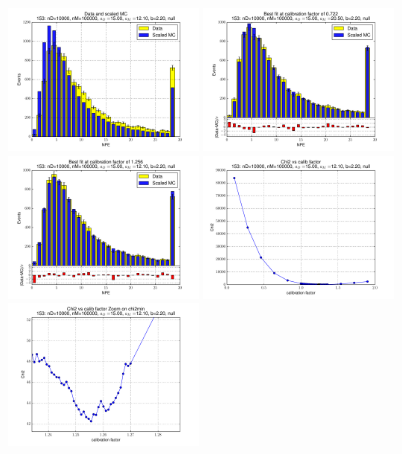 
 \begin{figure}[htbp] \begin{center} 
\includegraphics[width=0.45\textwidth]{../FIGURES/153/FIG_Data_and_scaled_MC.pdf} 
\includegraphics[width=0.45\textwidth]{../FIGURES/153/FIG_Best_fit_at_calibration_factor_of_0_722.pdf} 
\includegraphics[width=0.45\textwidth]{../FIGURES/153/FIG_Best_fit_at_calibration_factor_of_1_256.pdf} 
\includegraphics[width=0.45\textwidth]{../FIGURES/153/FIG_Chi2_vs_calib_factor.pdf} 
\includegraphics[width=0.45\textwidth]{../FIGURES/153/FIG_Chi2_vs_calib_factor_Zoom_on_chi2min.pdf} 

\end{center}
\end{figure}
